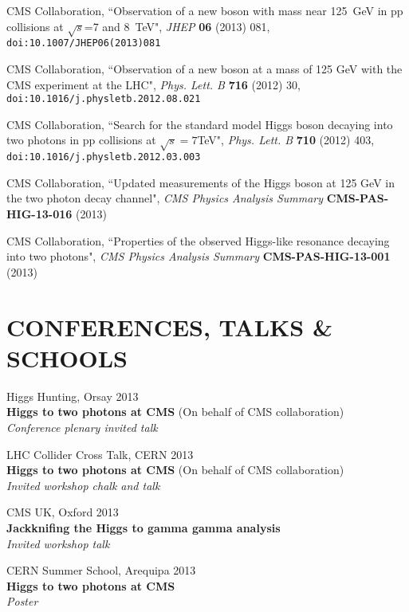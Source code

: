 \documentclass[margin, 10pt]{res} %
\begin{document}
\begin{resume}
CMS Collaboration, ``Observation of a new boson with mass near 125~GeV in pp collisions at $\sqrt{s}$=7 and 8~TeV",
\textit{JHEP} 
\textbf{06} (2013) 081, 
\texttt{doi:10.1007/JHEP06(2013)081}

CMS Collaboration, ``Observation of a new boson at a mass of 125 GeV with the CMS experiment at the LHC", 
\textit{Phys. Lett. B} 
\textbf{716} (2012) 30,
\texttt{\newline doi:10.1016/j.physletb.2012.08.021}

CMS Collaboration, ``Search for the standard model Higgs boson decaying into two photons in pp collisions at $\sqrt{s}=7$TeV",
\textit{Phys. Lett. B} 
\textbf{710} (2012) 403,
\texttt{\newline doi:10.1016/j.physletb.2012.03.003}

CMS Collaboration, ``Updated measurements of the Higgs boson at 125 GeV in the two photon decay channel",
\textit{CMS Physics Analysis Summary}
\textbf{CMS-PAS-HIG-13-016} (2013)

CMS Collaboration, ``Properties of the observed Higgs-like resonance decaying into two photons",
\textit{CMS Physics Analysis Summary}
\textbf{CMS-PAS-HIG-13-001} (2013)


\section{CONFERENCES, TALKS \& SCHOOLS}

Higgs Hunting, Orsay 2013 \\
\textbf{Higgs to two photons at CMS} (On behalf of CMS collaboration) \\
\textit{Conference plenary invited talk}

LHC Collider Cross Talk, CERN 2013 \\
\textbf{Higgs to two photons at CMS} (On behalf of CMS collaboration) \\
\textit{Invited workshop chalk and talk}

CMS UK, Oxford 2013 \\
\textbf{Jackknifing the Higgs to gamma gamma analysis} \\
\textit{Invited workshop talk}

CERN Summer School, Arequipa 2013 \\
\textbf{Higgs to two photons at CMS} \\
\textit{Poster}


\end{resume}
\end{document}
